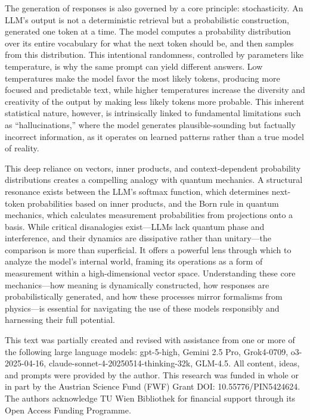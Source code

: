\documentclass[%
  reprint,
  superscriptaddress,
  showpacs,
  showkeys,
  amsmath,amssymb,
  pra,
  longbibliography,
  floatfix,
  x11names
]{revtex4-2}
\begin{document}
The generation of responses is also governed by a core principle: stochasticity. An LLM's output is not a deterministic retrieval but a probabilistic construction, generated one token at a time. The model computes a probability distribution over its entire vocabulary for what the next token should be, and then samples from this distribution. This intentional randomness, controlled by parameters like temperature, is why the same prompt can yield different answers. Low temperatures make the model favor the most likely tokens, producing more focused and predictable text, while higher temperatures increase the diversity and creativity of the output by making less likely tokens more probable. This inherent statistical nature, however, is intrinsically linked to fundamental limitations such as ``hallucinations,'' where the model generates plausible-sounding but factually incorrect information, as it operates on learned patterns rather than a true model of reality.

This deep reliance on vectors, inner products, and context-dependent probability distributions creates a compelling analogy with quantum mechanics. A structural resonance exists between the LLM's softmax function, which determines next-token probabilities based on inner products, and the Born rule in quantum mechanics, which calculates measurement probabilities from projections onto a basis. While critical disanalogies exist---LLMs lack quantum phase and interference, and their dynamics are dissipative rather than unitary---the
comparison is more than superficial. It offers a powerful lens through which to analyze the
model's internal world, framing its operations as a form of measurement within a
high-dimensional vector space. Understanding these core
mechanics---how meaning is dynamically constructed, how responses are
probabilistically generated, and how these processes mirror formalisms from physics---is
essential for navigating the use of these models responsibly and harnessing their full potential.

\begin{acknowledgments}
This text was partially created and revised with assistance from one or more of the following large language models: gpt-5-high, Gemini 2.5 Pro, Grok4-0709, o3-2025-04-16, claude-sonnet-4-20250514-thinking-32k, GLM-4.5. All content, ideas, and prompts were provided by the author.
This research was funded in whole or in part by the  Austrian Science Fund (FWF) Grant DOI: 10.55776/PIN5424624.
The authors acknowledge TU Wien Bibliothek for financial support through its Open Access Funding Programme.
\end{acknowledgments}
\end{document}
